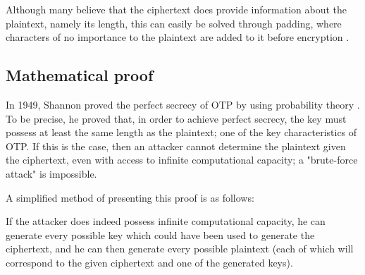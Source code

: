 \documentclass[12pt]{report}
\begin{document}
Although many believe that the ciphertext does provide information about the plaintext, namely its length, this can easily be solved through padding, where characters of no importance to the plaintext are added to it before encryption \cite{HutSix}.

\subsection{Mathematical proof}



In 1949, Shannon proved the perfect secrecy of OTP by using probability theory \cite{ShannonOTP}. To be precise, he proved that, in order to achieve perfect secrecy, the key must possess at least the same length as the plaintext; one of the key characteristics of OTP. If this is the case, then an attacker cannot determine the plaintext given the ciphertext, even with access to infinite computational capacity; a "brute-force attack" is impossible.



A simplified method of presenting this proof is as follows:

If the attacker does indeed possess infinite computational capacity, he can generate every possible key which could have been used to generate the ciphertext, and he can then generate every possible plaintext (each of which will correspond to the given ciphertext and one of the generated keys).

\end{document}
